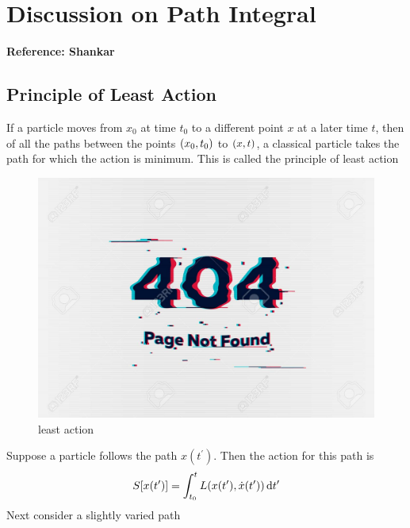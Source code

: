 		\section{Discussion on Path Integral}
		\textbf{Reference: Shankar}
		\subsection{Principle of Least Action}
		If a particle moves from $x_0$ at time $t_0$ to a different point $x$ at a later time $t$, then of all the paths between the points $\qty(x_0, t_0)$ to $\qty(x,t)$, a classical particle takes the path for which the action is minimum. This is called the principle of least action
		
		\begin{figure}
			\centering
			\includegraphics[width=0.5\linewidth]{Pictures/not-found.jpg}
			\caption{least action}
		\end{figure}
		Suppose a particle follows the path $x(t^\prime)$. Then the action for this path is
		\begin{equation}
			S\qty[x\qty(t^\prime)] = \int_{t_0}^{t} L(x(t^\prime), \dot{x}(t^\prime)) \dd{t^\prime}
		\end{equation}
		Next consider a slightly varied path
		
